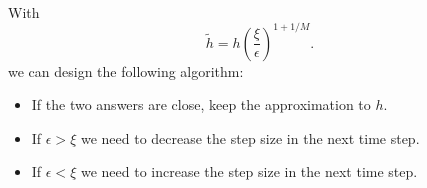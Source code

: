 \documentclass[%
oneside,                 %
final,                   %
10pt]{article}
\begin{document}
\paragraph{}
With 
\[
\tilde{h}=h\left(\frac{\xi}{\epsilon}\right)^{1+1/M}. 
\]
we can design the following algorithm:
\begin{itemize}
 \item If the two answers are close, keep the approximation to $h$.

 \item If $\epsilon > \xi$ we need to decrease the step size in the next time step.

 \item If $\epsilon < \xi$ we need to increase the step size in the next time step.
\end{itemize}

\noindent












\end{document}
